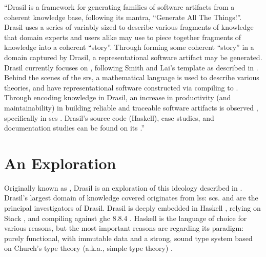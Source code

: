 
\begin{mdleftbar}
      ``Drasil is a framework for generating families of software artifacts from
      a coherent knowledge base, following its mantra, ``Generate All The
      Things!''. Drasil uses a series of variably sized  to describe
      various fragments of knowledge that domain experts and users alike may use
      to piece together fragments of knowledge into a coherent ``story''.
      Through forming some coherent ``story'' in a domain captured by Drasil, a
      representational software artifact may be generated. Drasil currently
      focuses on , following Smith and Lai's  template as
      described in \cite{SmithAndLai2005}. Behind the scenes of the \acs{srs}, a
      mathematical language is used to describe various theories, and have
      representational software constructed via compiling to 
      \cite{Carette2019}. Through encoding knowledge in Drasil, an increase in
      productivity (and maintainability) in building reliable and traceable
      software artifacts is observed \cite{SzymczakEtAl2016}, specifically in
      \acs{scs} \cite{Smith2018}. Drasil's source code (Haskell), case studies,
      and documentation studies can be found on its
      .''
      \cite{Balaci2021Poster}
\end{mdleftbar}

\section{An Exploration}

Originally known as  , Drasil is an exploration of this
ideology described in . Drasil's largest domain of knowledge
covered originates from \acs{lss}: \acl{scs}.  and  are the principal investigators of
Drasil. Drasil is deeply embedded in Haskell \cite{Haskell2010}, relying on
Stack , and compiling against \acs{ghc} 8.8.4 \cite{GHC884}.
Haskell is the language of choice for various reasons, but the most important
reasons are regarding its paradigm: purely functional, with immutable data and a
strong, sound type system based on Church's type theory (a.k.a., simple type
theory) .

